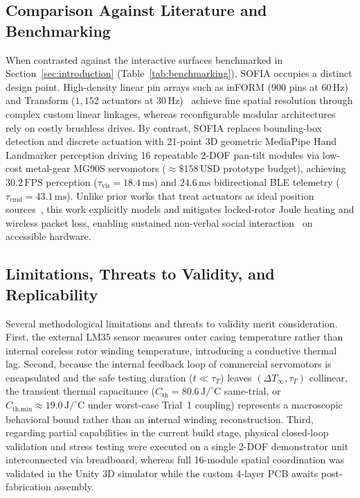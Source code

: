 \documentclass[lettersize,journal]{IEEEtran}
\begin{document}
	\subsection{Comparison Against Literature and Benchmarking}
	\label{sec:disc_comparison}
	
	When contrasted against the interactive surfaces benchmarked in
	Section~\ref{sec:introduction} (Table~\ref{tab:benchmarking}), SOFIA
	occupies a distinct design point. High-density linear pin arrays such as
	inFORM ($900$ pins at $60\,\text{Hz}$)~\cite{follmer2013inform} and Transform
	($1,152$ actuators at $30\,\text{Hz}$)~\cite{nakagaki2016transform} achieve
	fine spatial resolution through complex custom linear linkages, whereas
	reconfigurable modular architectures~\cite{seo2019modular} rely on costly brushless
	drives. By contrast, SOFIA replaces bounding-box detection and discrete
	actuation with 21-point 3D geometric MediaPipe Hand Landmarker perception
	driving 16 repeatable 2-DOF pan-tilt modules via low-cost metal-gear MG90S
	servomotors ($\approx \$158\,\text{USD}$ prototype budget), achieving
	$30.2\,\text{FPS}$ perception ($\tau_{\text{vis}} = 18.4\,\text{ms}$) and
	$24.6\,\text{ms}$ bidirectional BLE telemetry ($\tau_{\text{cmd}} = 43.1\,\text{ms}$). Unlike prior works that treat
	actuators as ideal position sources~\cite{follmer2013inform,seo2019modular},
	this work explicitly models and mitigates locked-rotor Joule heating and
	wireless packet loss, enabling sustained non-verbal social
	interaction~\cite{fong2003social} on accessible hardware.
	
	\subsection{Limitations, Threats to Validity, and Replicability}
	\label{sec:disc_limitations}
	
	Several methodological limitations and threats to
	validity merit consideration. First, the external LM35 sensor measures outer
	casing temperature rather than internal coreless rotor winding temperature,
	introducing a conductive thermal lag. Second, because the internal feedback
	loop of commercial servomotors is encapsulated and the safe testing duration
	($t \ll \tau_T$) leaves $(\Delta T_\infty, \tau_T)$ collinear, the transient
	thermal capacitance ($C_{\text{th}} = 80.6\,\text{J/}^\circ\text{C}$ same-trial,
	or $C_{\text{th,min}} \approx 19.0\,\text{J/}^\circ\text{C}$ under worst-case
	Trial~1 coupling) represents a macroscopic behavioral bound rather than an
	internal winding reconstruction. Third, regarding partial capabilities in the current build
	stage, physical closed-loop validation and stress testing were executed on a
	single 2-DOF demonstrator unit interconnected via breadboard, whereas full
	16-module spatial coordination was validated in the Unity 3D simulator while
	the custom 4-layer PCB awaits post-fabrication assembly.
	
\end{document}
